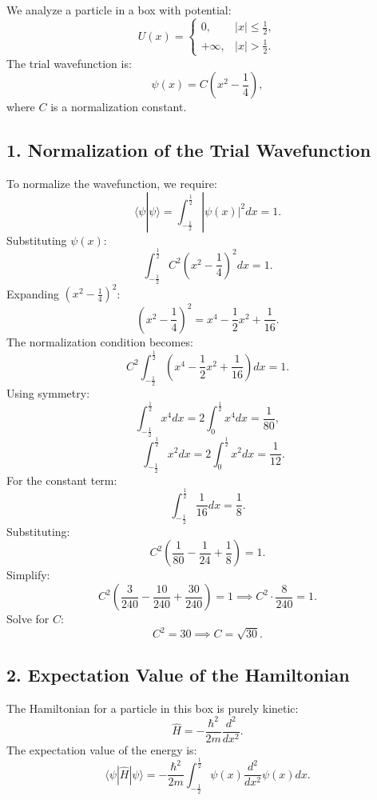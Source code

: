 \documentclass[a4paper,12pt]{article}
\begin{document}
\begin{multicols}{2}
We analyze a particle in a box with potential:
\[
U(x) = 
\begin{cases}
0, & |x| \leq \frac{1}{2}, \\
+\infty, & |x| > \frac{1}{2}.
\end{cases}
\]
The trial wavefunction is:
\[
\psi(x) = C\left(x^2 - \frac{1}{4}\right),
\]
where \( C \) is a normalization constant. 

\subsection*{1. Normalization of the Trial Wavefunction}
To normalize the wavefunction, we require:
\[
\langle \psi | \psi \rangle = \int_{-\frac{1}{2}}^{\frac{1}{2}} |\psi(x)|^2 dx = 1.
\]
Substituting \( \psi(x) \):
\[
\int_{-\frac{1}{2}}^{\frac{1}{2}} C^2 \left(x^2 - \frac{1}{4}\right)^2 dx = 1.
\]
Expanding \( \left(x^2 - \frac{1}{4}\right)^2 \):
\[
\left(x^2 - \frac{1}{4}\right)^2 = x^4 - \frac{1}{2}x^2 + \frac{1}{16}.
\]
The normalization condition becomes:
\[
C^2 \int_{-\frac{1}{2}}^{\frac{1}{2}} \left(x^4 - \frac{1}{2}x^2 + \frac{1}{16}\right) dx = 1.
\]
Using symmetry:
\[
\int_{-\frac{1}{2}}^{\frac{1}{2}} x^4 dx = 2 \int_{0}^{\frac{1}{2}} x^4 dx = \frac{1}{80}, 
\]
\[
\quad 
\int_{-\frac{1}{2}}^{\frac{1}{2}} x^2 dx = 2 \int_{0}^{\frac{1}{2}} x^2 dx = \frac{1}{12}.
\]
For the constant term:
\[
\int_{-\frac{1}{2}}^{\frac{1}{2}} \frac{1}{16} dx = \frac{1}{8}.
\]
Substituting:
\[
C^2 \left(\frac{1}{80} - \frac{1}{24} + \frac{1}{8}\right) = 1.
\]
Simplify:
\[
C^2 \left(\frac{3}{240} - \frac{10}{240} + \frac{30}{240}\right) = 1 \implies C^2 \cdot \frac{8}{240} = 1.
\]
Solve for \( C \):
\[
C^2 = 30 \implies C = \sqrt{30}.
\]

\subsection*{2. Expectation Value of the Hamiltonian}
The Hamiltonian for a particle in this box is purely kinetic:
\[
\hat{H} = -\frac{\hbar^2}{2m} \frac{d^2}{dx^2}.
\]
The expectation value of the energy is:
\[
\langle \psi | \hat{H} | \psi \rangle = -\frac{\hbar^2}{2m} \int_{-\frac{1}{2}}^{\frac{1}{2}} \psi(x) \frac{d^2}{dx^2} \psi(x) dx.
\]


\end{multicols}
\end{document}
